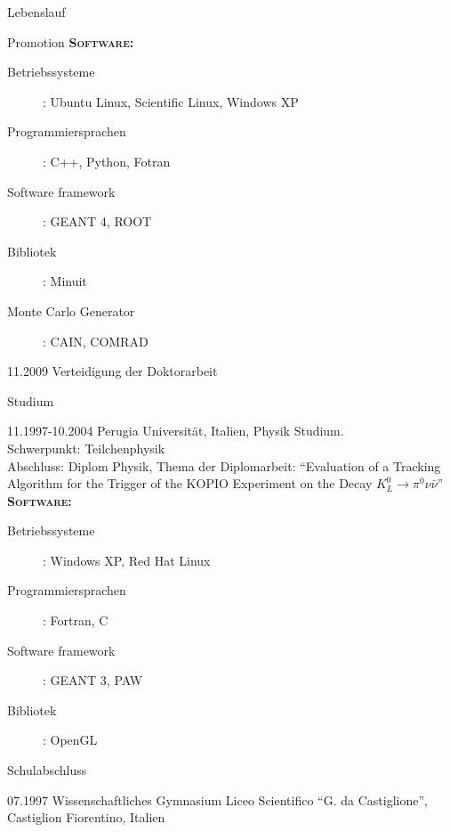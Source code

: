 \documentclass[11pt,a4paper]{scrartcl}
\begin{document}
\begin{cv}{Lebenslauf}
\begin{cvlist}{Promotion}
{\scshape {\bfseries Software:}}
\begin{description}
\item[Betriebssysteme] : Ubuntu Linux, Scientific Linux, Windows XP
\item[Programmiersprachen] : C++, Python, Fotran
\item[Software framework] : GEANT 4, ROOT
\item[Bibliotek] : Minuit
\item[Monte Carlo Generator] : CAIN, COMRAD
\end{description}

\item[11.2009] Verteidigung der Doktorarbeit

\end{cvlist}

\begin{cvlist}{Studium}
\item [11.1997-10.2004]Perugia Universit\"at, Italien, Physik
Studium. \\ Schwerpunkt: Teilchenphysik\\ Abschluss: Diplom
Physik, Thema der Diplomarbeit: "`Evaluation of a Tracking
Algorithm for the Trigger of the KOPIO Experiment on the Decay
$K_L^0\rightarrow\pi^0\nu\bar{\nu}$"'\\

% 

{\scshape {\bfseries Software:}}
\begin{description}
\item[Betriebssysteme] : Windows XP, Red Hat Linux
\item[Programmiersprachen] : Fortran, C
\item[Software framework] : GEANT 3, PAW
\item[Bibliotek] : OpenGL
\end{description}
\end{cvlist}

\begin{cvlist}{Schulabschluss}
\item[07.1997] Wissenschaftliches Gymnasium Liceo Scientifico "`G. da
Castiglione"', Castiglion Fiorentino, Italien
\end{cvlist}


\end{cv}
\end{document}
